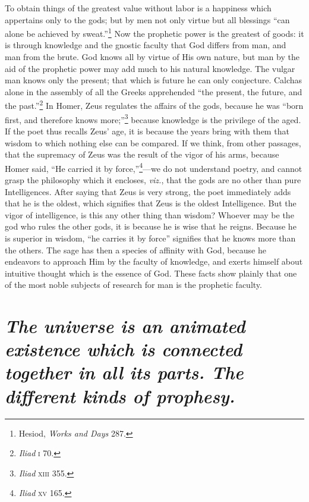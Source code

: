 \documentclass[12pt]{article}
\begin{document}
To obtain things of the greatest value without labor is a happiness which
appertains only to the gods; but by men not only virtue but all blessings ``can
alone be achieved by sweat.''\footnote{Hesiod, \textit{Works and Days} 287.}
Now the prophetic power is the greatest of goods: it is through knowledge and
the gnostic faculty that God differs from man, and man from the brute. God
knows all by virtue of His own nature, but man by the aid of the prophetic
power may add much to his natural knowledge. The vulgar man knows only the
present; that which is future he can only conjecture. Calchas alone in the
assembly of all the Greeks apprehended ``the present, the future, and the
past.''\footnote{\textit{Iliad} \textsc{i} 70.} In Homer, Zeus regulates the
affairs of the gods, because he was ``born first, and therefore knows
more;''\footnote{\textit{Iliad} \textsc{xiii} 355.} because knowledge is the
privilege of the aged. If the poet thus recalls Zeus' age, it is because the
years bring with them that wisdom to which nothing else can be compared. If we
think, from other passages, that the supremacy of Zeus was the result of the
vigor of his arms, because Homer said, ``He carried it by
force,''\footnote{\textit{Iliad} \textsc{xv} 165.}---we do not understand
poetry, and cannot grasp the philosophy which it encloses, \textit{viz.}, that
the gods are no other than pure Intelligences. After saying that Zeus is very
strong, the poet immediately adds that he is the oldest, which signifies that
Zeus is the oldest Intelligence. But the vigor of intelligence, is this any
other thing than wisdom? Whoever may be the god who rules the other gods, it is
because he is wise that he reigns. Because he is superior in wisdom, ``he
carries it by force'' signifies that he knows more than the others. The sage
has then a species of affinity with God, because he endeavors to approach Him
by the faculty of knowledge, and exerts himself about intuitive thought which
is the essence of God. These facts show plainly that one of the most noble
subjects of research for man is the prophetic faculty.


\section{\mdseries\itshape The universe is an animated existence which is
connected together in all its parts. The different kinds of prophesy.}
\end{document}

